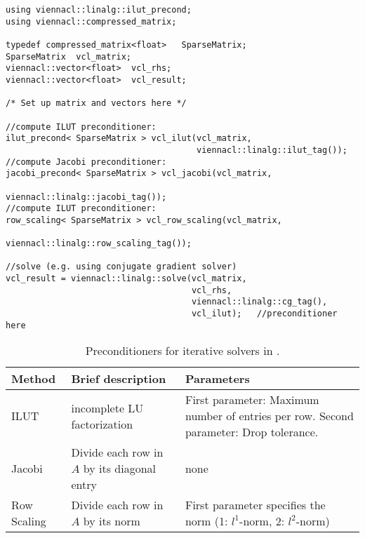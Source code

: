 \begin{lstlisting}
using viennacl::linalg::ilut_precond;
using viennacl::compressed_matrix;

typedef compressed_matrix<float>   SparseMatrix;
SparseMatrix  vcl_matrix;
viennacl::vector<float>  vcl_rhs;
viennacl::vector<float>  vcl_result;

/* Set up matrix and vectors here */

//compute ILUT preconditioner:
ilut_precond< SparseMatrix > vcl_ilut(vcl_matrix,
                                      viennacl::linalg::ilut_tag());
//compute Jacobi preconditioner:
jacobi_precond< SparseMatrix > vcl_jacobi(vcl_matrix,
                                          viennacl::linalg::jacobi_tag());
//compute ILUT preconditioner:
row_scaling< SparseMatrix > vcl_row_scaling(vcl_matrix,
                                      viennacl::linalg::row_scaling_tag());

//solve (e.g. using conjugate gradient solver)
vcl_result = viennacl::linalg::solve(vcl_matrix,
                                     vcl_rhs,
                                     viennacl::linalg::cg_tag(),
                                     vcl_ilut);   //preconditioner here
\end{lstlisting}

\begin{table}[tb]
\begin{center}
\renewcommand{\arraystretch}{1.2}
\begin{tabular}{p{3cm}|p{4cm}|p{7cm}}
Method & Brief description & Parameters\\
\hline
ILUT & incomplete LU factorization & First parameter: Maximum number of entries
per row. Second parameter: Drop tolerance. \\
Jacobi & Divide each row in $A$ by its diagonal entry & none \\
Row Scaling & Divide each row in $A$ by its norm & First parameter specifies
the norm (1: $l^1$-norm, 2: $l^2$-norm)\\
\hline
\end{tabular}
\caption{Preconditioners for iterative solvers in {\ViennaCL}.}
\label{tab:preconditioners}
\end{center}
\end{table}
